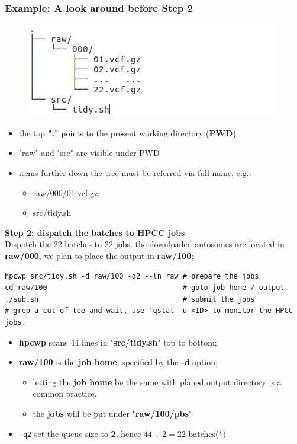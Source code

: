 \documentclass{beamer}
\begin{document}
\begin{frame}[fragile]
\frametitle{Example: A look around before Step 2}
\begin{figure}
\includegraphics[width=0.7\linewidth]{img/step1}
\end{figure}
\begin{itemize}
\item the top \textbf{"."} points to the present working directory (\textbf{PWD})
\item "raw" and "src" are visible under PWD
\item items further down the tree must be referred via full name, e.g.:
  \begin{itemize}
  \item raw/000/01.vcf.gz
  \item src/tidy.sh
  \end{itemize}
\end{itemize}

\end{frame}


\begin{frame}[fragile]
\textbf{Step 2: dispatch the batches to HPCC jobs} \\
Dispatch the 22 batches to 22 jobs.
the downloaded autosomes are located in \textbf{raw/000}, we plan to place the output in \textbf{raw/100};
\begin{example}
\begin{lstlisting}
hpcwp src/tidy.sh -d raw/100 -q2 --ln raw # prepare the jobs
cd raw/100                                # goto job home / output
./sub.sh                                  # submit the jobs
# grep a cut of tee and wait, use 'qstat -u <ID> to monitor the HPCC jobs.
\end{lstlisting}
\end{example}
\begin{itemize}
\item \textbf{hpcwp} scans 44 lines in "\textbf{src/tidy.sh}" top to bottom;
\item \textbf{raw/100} is the \textbf{job home}, specified by the \textbf{-d} option;
  \begin{itemize}
  \item letting the \textbf{job home} be the same with planed output directory is a common practice.
  \item the \textbf{jobs} will be put under "\textbf{raw/100/pbs}"
  \end{itemize}
\item \texttt{-q2} set the queue size to \textbf{2}, hence $44 \div 2 = 22$ batches(*)
\end{itemize}
\end{frame}
\end{document}
